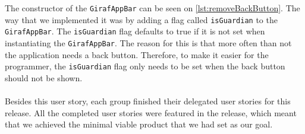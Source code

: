 The constructor of the \texttt{GirafAppBar} can be seen on \autoref{lst:removeBackButton}. 
The way that we implemented it was by adding a flag called \texttt{isGuardian} to the \texttt{GirafAppBar}. 
The \texttt{isGuardian} flag defaults to true if it is not set when instantiating the \texttt{GirafAppBar}.
The reason for this is that more often than not the application needs a back button.
Therefore, to make it easier for the programmer, the \texttt{isGuardian} flag only needs to be set when the back button should not be shown.
\\\\
Besides this user story, each group finished their delegated user stories for this release.
All the completed user stories were featured in the release, which meant that we achieved the minimal viable product that we had set as our goal. 
